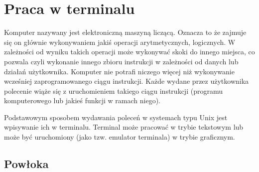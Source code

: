 % 
% 
% 
% 

\section{Praca w terminalu}

Komputer nazywany jest elektroniczną maszyną liczącą. Oznacza to że zajmuje się on głównie wykonywaniem jakiś operacji arytmetycznych, logicznych.
W zależności od wyniku takich operacji może wykonywać skoki do innego miejsca, co pozwala czyli wykonanie innego zbioru instrukcji w zależności od danych lub działań użytkownika.
Komputer nie potrafi niczego więcej niż wykonywanie wcześniej zaprogramowanego ciągu instrukcji.
Każde wydane przez użytkownika polecenie wiąże się z uruchomieniem takiego ciągu instrukcji (programu komputerowego lub jakieś funkcji w ramach niego).

Podstawowym sposobem wydawania poleceń w systemach typu Unix jest wpisywanie ich w terminalu.
Terminal może pracować w trybie tekstowym lub może być uruchomiony (jako tzw. emulator terminala) w trybie graficznym.

\subsection{Powłoka}

